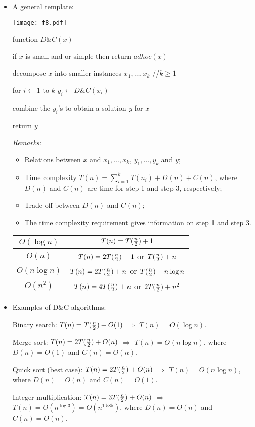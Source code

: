\documentclass{article}
\begin{document}
\begin{itemize}

\item A general template:

\vskip 0.25cm
\begin{center}
\texttt{[image: f8.pdf]}
\end{center}

function $D\&C(x)$

\qquad if $x$ is small and or simple then return $adhoc(x)$

\qquad decompose $x$ into smaller instances $x_1,\ldots,x_k$ //$k\ge1$

\qquad for $i\leftarrow 1$ to $k$ $y_i\leftarrow D\&C(x_i)$

\qquad combine the $y_i$'s to obtain a solution $y$ for $x$

\qquad return $y$

{\em Remarks:} 

\begin{itemize}
\item Relations between $x$ and $x_1,\ldots,x_k$,
$y_1,\ldots,y_k$ and $y$; 

\item Time complexity $T(n)=\sum_{i=1}^k
T(n_i)+D(n)+C(n)$, where $D(n)$ and $C(n)$ are time for step 1 and
step 3, respectively; 

\item Trade-off between $D(n)$ and $C(n)$;

\item The time complexity requirement gives information on step 1
and step 3.
\end{itemize}

\begin{center}
\begin{tabular}{c|c}
$O(\log n)$ & $T(n)=T({n\over 2})+1$\\\hline
$O(n)$ & $T(n)=2T({n\over2})+1$ or $T({n\over2})+n$\\\hline
$O(n\log n)$ & $T(n)=2T({n\over2})+n$ or $T({n\over2})+n\log n$\\\hline
$O(n^2)$ & $T(n)=4T({n\over2})+n$ or $2T({n\over2})+n^2$
\end{tabular}
\end{center}
 
\item Examples of D\&C algorithms:

Binary search: $T(n)=T({n\over2})+O(1)$ $\Rightarrow$ $T(n)=O(\log n)$.

Merge sort: $T(n)=2T({n\over2})+O(n)$ $\Rightarrow$ $T(n)=O(n\log n)$,
where $D(n)=O(1)$ and $C(n)=O(n)$.

Quick sort (best case): $T(n)=2T({n\over2})+O(n)$ $\Rightarrow$ 
$T(n)=O(n\log n)$,
where $D(n)=O(n)$ and $C(n)=O(1)$.
 
Integer multiplication: $T(n)=3T({n\over2})+O(n)$ $\Rightarrow$
$T(n)=O(n^{\log 3})=O(n^{1.585})$, where $D(n)=O(n)$ and
$C(n)=O(n)$.

\end{itemize}
\end{document}
